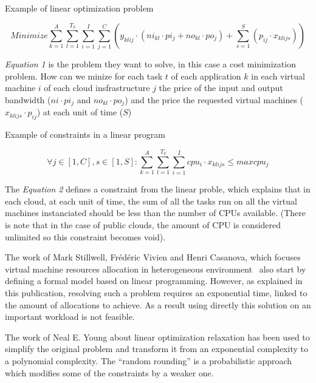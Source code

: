 \documentclass[a4paper,11pt]{article}
\begin{document}
\begin{figequation}
	\caption{Example of linear optimization problem}
	\[
		Minimize
		\sum_{k=1}^A \sum_{l=1}^{T_k} \sum_{i=1}^I \sum_{j=1}^C ( y_{klij} \cdot (ni_{kl} \cdot {pi_j} + no_{kl} \cdot po_j) + \sum_{s=1}^S ( p_{ij} \cdot x_{klijs} ))
	\]
\end{figequation}

\textit{Equation 1} is the problem they want to solve, in this case a cost
minimization problem. How can we minize for each task $t$ of each application
$k$ in each virtual machine $i$ of each cloud insfrastructure $j$ the price of
the input and output bandwidth ($ni \cdot pi_j$ and $no_{kl} \cdot po_j$) and
the price the requested virtual machines ($x_{klijs} \cdot p_{ij}$) at each
unit of time ($S$)

\begin{figequation}
	\caption{Example of constraints in a linear program}
	\[
		\forall j \in [1,C], s \in [1,S]:
		\sum_{k=1}^{A} \sum_{l=1}^{T_k} \sum_{i=1}^{I} cpu_i \cdot x_{klijs} \leq maxcpu_j
	\]
\end{figequation}

The \textit{Equation 2} defines a constraint from the linear proble, which
explains that in each cloud, at each unit of time, the sum of all the tasks run
on all the virtual machines instanciated should be less than the number of CPUs
available.  (There is note that in the case of public clouds, the amount of CPU
is considered unlimited so this constraint becomes void).

\vspace{1em}

The work of Mark Stillwell, Frédéric Vivien and Henri Casanova, which
focuses virtual machine resources allocation in heterogeneous
environment~\cite{allocation:heterogeneous} also start by defining a formal
model based on linear programming. However, as explained in this publication,
resolving such a problem requires an exponential time, linked to the amount of
allocations to achieve. As a result using directly this solution on an
important workload is not feasible.

\vspace{1em}

The work of Neal E. Young about linear optimization
relaxation\cite{maths:rrndlp} has been used to simplify the original problem
and transform it from an exponential complexity to a polynomial complexity. The
“random rounding” is a probabilistic approach which modifies some of the
constraints by a weaker one.
\end{document}
